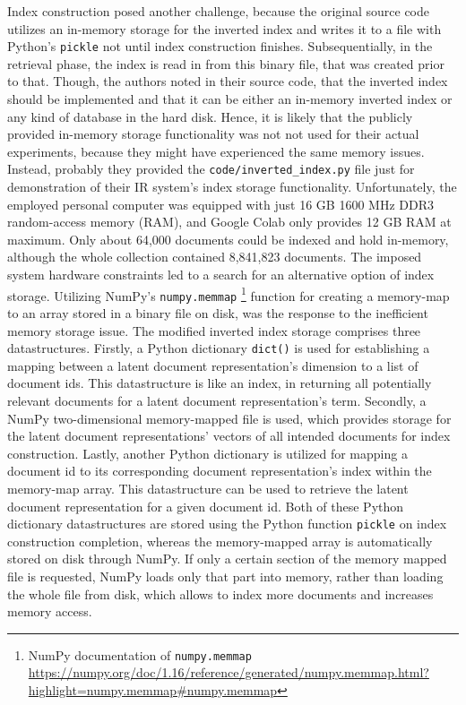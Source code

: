 Index construction posed another challenge, because the original source code utilizes an in-memory storage
    for the inverted index and writes it to a file with Python's \texttt{pickle} not until index construction finishes.
Subsequentially, in the retrieval phase, the index is read in from this binary file, that was created prior to that.
Though, the authors noted in their source code, that the inverted index should be implemented and that it can be 
    either an in-memory inverted index or any kind of database in the hard disk.
Hence, it is likely that the publicly provided in-memory storage functionality was not not used for their actual experiments,
    because they might have experienced the same memory issues.
Instead, probably they provided the \verb|code/inverted_index.py| file just for demonstration of their IR system's index
    storage functionality.
Unfortunately, the employed personal computer was equipped with just 16 GB 1600 MHz DDR3 random-access memory (RAM),
    and Google Colab only provides 12 GB RAM at maximum.
Only about 64,000 documents could be indexed and hold in-memory, although the whole collection contained 8,841,823 documents.
The imposed system hardware constraints led to a search for an alternative option of index storage.
Utilizing NumPy's \texttt{numpy.memmap}
    \footnote{NumPy documentation of \texttt{numpy.memmap} \url{https://numpy.org/doc/1.16/reference/generated/numpy.memmap.html?highlight=numpy.memmap\#numpy.memmap}} 
    function for creating a memory-map to an array stored in a binary file on disk, was the response to the 
    inefficient memory storage issue.
The modified inverted index storage comprises three datastructures.
Firstly, a Python dictionary \texttt{dict()} is used for establishing a mapping between a latent document representation's dimension
    to a list of document ids.
This datastructure is like an index, in returning all potentially relevant documents for a latent document representation's term.
Secondly, a NumPy two-dimensional memory-mapped file is used, which provides storage for the latent document representations' vectors
    of all intended documents for index construction.
Lastly, another Python dictionary is utilized for mapping a document id to its corresponding document representation's index within the memory-map array.
This datastructure can be used to retrieve the latent document representation for a given document id.
Both of these Python dictionary datastructures are stored using the Python function \texttt{pickle} on index construction completion,
    whereas the memory-mapped array is automatically stored on disk through NumPy.
If only a certain section of the memory mapped file is requested, NumPy loads only that part into memory, rather than loading the whole file from disk,
    which allows to index more documents and increases memory access.

